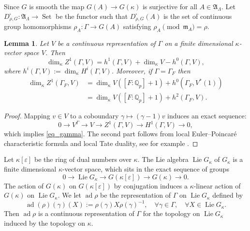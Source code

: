 \documentclass{amsart}
\newtheorem{lem}[prop]{Lemma}
\theoremstyle{definition}
\theoremstyle{remark}
\DeclareMathOperator{\Set}{Set}
\newcommand{\Qp}{\mathbb {Q}_p}
\newcommand{\Aa}{\mathfrak A}
\newcommand{\mm}{\mathfrak m}
\DeclareMathOperator{\ad}{ad}
\DeclareMathOperator{\Lie}{Lie}
\begin{document}
 Since $G$ is  smooth the map $G(A)\rightarrow G(\kappa)$ is surjective for all $A\in \Aa_{\Lambda}$. Let  $D^{\square}_{\rho, G}: \mathfrak A_{\Lambda}
\rightarrow \Set$ be the functor such that  
$D^{\square}_{\rho, G}(A)$ is the set of 
continuous group homomorphisms $\rho_A: \Gamma\rightarrow 
G(A)$ satisfying $\rho_A \pmod{\mm_A}=\rho$.  

\begin{lem}\label{dimZ1} Let $V$ be a continuous representation of $\Gamma$ on a finite dimensional 
$\kappa$-vector space $V$. Then 
\begin{equation}\label{eq_gamma}
\dim_{\kappa} Z^1(\Gamma, V)= h^1(\Gamma, V) +\dim_{\kappa} V - h^0(\Gamma, V),
\end{equation}
where $h^i(\Gamma, V):= \dim_{\kappa} H^i(\Gamma, V)$. Moreover, if $\Gamma=\Gamma_F$ then 
\begin{equation}
\begin{split}
\dim_{\kappa} Z^1(\Gamma_F, V)&=\dim_{\kappa} V ( [F:\Qp]+1)+ h^0(\Gamma_F, V^*(1))\\
&= \dim_{\kappa} V ([F:\Qp]+1)+ h^2(\Gamma_F, V).
\end{split}
\end{equation}
\end{lem}

\begin{proof} Mapping $v\in V$ to a coboundary $\gamma\mapsto (\gamma-1) v$ induces an exact sequence:
$$0\rightarrow V^{\Gamma} \rightarrow V \rightarrow Z^1(\Gamma, V)\rightarrow 
H^1(\Gamma, V)\rightarrow 0,$$
which implies \eqref{eq_gamma}. The second part follows from 
local Euler--Poincar\'{e} characteristic formula and local Tate duality, see for example \cite[Theorem 3.4.1]{BJ_new}.
\end{proof} 

Let $\kappa[\varepsilon]$ be the ring of dual numbers over $\kappa$. 
The Lie algebra $\Lie G_{\kappa}$ of $G_{\kappa}$ is a finite dimensional $\kappa$-vector space, which sits in the exact sequence
of groups 
$$ 0\rightarrow   \Lie G_{\kappa}\rightarrow G(\kappa[\varepsilon])\rightarrow G(\kappa)\rightarrow 0.$$
The action of $G(\kappa)$ on $G(\kappa[\varepsilon])$ by conjugation induces 
a $\kappa$-linear action of $G(\kappa)$ on $\Lie G_{\kappa}$. 
We let $\ad \rho$ be the representation of $\Gamma$ on $\Lie G_{\kappa}$
defined by $$\ad(\rho)(\gamma)(X):= \rho(\gamma) X \rho(\gamma)^{-1}, \quad \forall \gamma\in \Gamma, \quad \forall X\in \Lie G_{\kappa}.$$ Then $\ad \rho$ is a continuous 
representation of $\Gamma$ for the topology on $\Lie G_{\kappa}$ induced by the topology on $\kappa$. 
\end{document}
